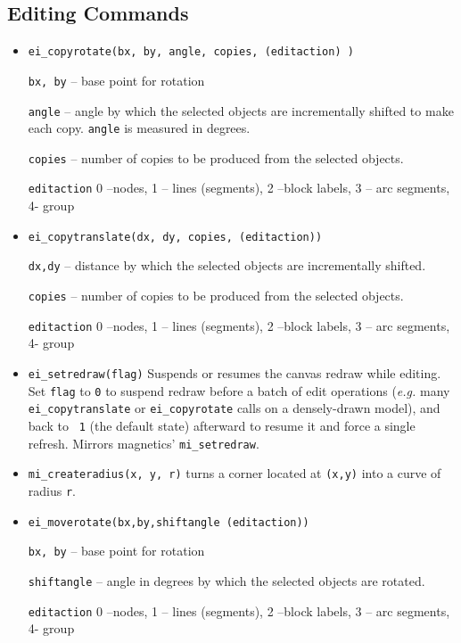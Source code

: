 \subsection{Editing Commands}
\begin{itemize}

\item \texttt{ei\_copyrotate(bx, by, angle, copies, (editaction) )}

\texttt{bx, by} -- base point for rotation

\texttt{angle} -- angle by which the selected objects are incrementally
shifted to make each copy. \texttt{angle} is measured in degrees.

\texttt{copies} -- number of copies to be produced from the selected
objects.

\texttt{editaction} 0 --nodes, 1 -- lines (segments), 2 --block labels, 3 --
arc segments, 4- group

\item \texttt{ei\_copytranslate(dx, dy, copies, (editaction))}

\texttt{dx,dy} -- distance by which the selected objects are incrementally
shifted.

\texttt{copies} -- number of copies to be produced from the selected
objects.

\texttt{editaction} 0 --nodes, 1 -- lines (segments), 2 --block labels, 3 --
arc segments, 4- group

\item{\tt ei\_setredraw(flag)} Suspends or resumes the canvas redraw
while editing. Set {\tt flag} to {\tt 0} to suspend redraw before a
batch of edit operations ({\em e.g.} many {\tt ei\_copytranslate} or
{\tt ei\_copyrotate} calls on a densely-drawn model), and back to {\tt
1} (the default state) afterward to resume it and force a single
refresh. Mirrors magnetics' {\tt mi\_setredraw}.

\item{\tt mi\_createradius(x, y, r)} turns a corner located at {\tt (x,y)} into a curve of radius {\tt r}.

\item \texttt{ei\_moverotate(bx,by,shiftangle (editaction))}

\texttt{bx, by} -- base point for rotation

\texttt{shiftangle} -- angle in degrees by which the selected objects are
rotated.

\texttt{editaction} 0 --nodes, 1 -- lines (segments), 2 --block labels, 3 --
arc segments, 4- group


\end{itemize}
